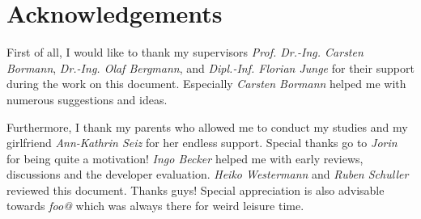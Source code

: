 \chapter{Acknowledgements}

First of all, I would like to thank my supervisors \emph{Prof. Dr.-Ing. Carsten
Bormann}, \emph{Dr.-Ing. Olaf Bergmann}, and \emph{Dipl.-Inf. Florian Junge}
for their support during the work on this document. Especially \emph{Carsten
Bormann} helped me with numerous suggestions and ideas.

Furthermore, I thank my parents who allowed me to conduct my studies and my
girlfriend \emph{Ann-Kathrin Seiz} for her endless support. Special thanks go
to \emph{Jorin} for being quite a motivation! \emph{Ingo Becker} helped me with
early reviews, discussions and the developer evaluation. \emph{Heiko
Westermann} and \emph{Ruben Schuller} reviewed this document. Thanks guys!
Special appreciation is also advisable towards \emph{foo@} which was always
there for weird leisure time.

